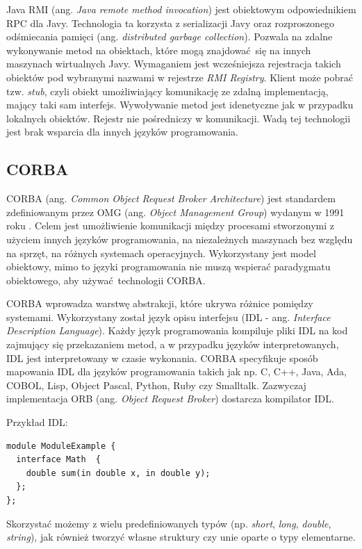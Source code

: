 Java RMI (ang. \textit{Java remote method invocation}) jest obiektowym odpowiednikiem RPC dla Javy. Technologia ta korzysta z serializacji Javy oraz rozproszonego odśmiecania pamięci (ang. \textit{distributed garbage collection}). Pozwala na zdalne wykonywanie metod na obiektach, które mogą znajdować się na innych maszynach wirtualnych Javy. Wymaganiem jest wcześniejsza rejestracja takich obiektów pod wybranymi nazwami w rejestrze \textit{RMI Registry}. Klient może pobrać tzw. \textit{stub}, czyli obiekt umożliwiający komunikację ze zdalną implementacją, mający taki sam interfejs. Wywoływanie metod jest idenetyczne jak w przypadku lokalnych obiektów. Rejestr nie pośredniczy w komunikacji. Wadą tej technologii jest brak wsparcia dla innych języków programowania.


\subsection{CORBA}

CORBA (ang. \textit{Common Object Request Broker Architecture}) jest standardem zdefiniowanym przez OMG (ang. \textit{Object Management Group}) wydanym w 1991 roku \cite{CORBA}. Celem jest umożliwienie komunikacji między procesami stworzonymi z użyciem innych języków programowania, na niezależnych maszynach bez względu na sprzęt, na różnych systemach operacyjnych. Wykorzystany jest model obiektowy, mimo to języki programowania nie muszą wspierać paradygmatu obiektowego, aby używać technologii CORBA.

CORBA wprowadza warstwę abstrakcji, które ukrywa różnice pomiędzy systemami. Wykorzystany został język opisu interfejsu (IDL - ang. \textit{Interface Description Language}). Każdy język programowania kompiluje pliki IDL na kod zajmujący się przekazaniem metod, a w przypadku języków interpretowanych, IDL jest interpretowany w czasie wykonania. CORBA specyfikuje sposób mapowania IDL dla języków programowania takich jak np. C, C++, Java, Ada, COBOL, Lisp, Object Pascal, Python, Ruby czy Smalltalk. Zazwyczaj implementacja ORB (ang. \textit{Object Request Broker}) dostarcza kompilator IDL.

Przykład IDL:
\begin{lstlisting}
module ModuleExample {
  interface Math  {
    double sum(in double x, in double y);
  };
};
\end{lstlisting}

Skorzystać możemy z wielu predefiniowanych typów (np. \textit{short}, \textit{long}, \textit{double}, \textit{string}), jak również tworzyć własne struktury czy unie oparte o typy elementarne.

